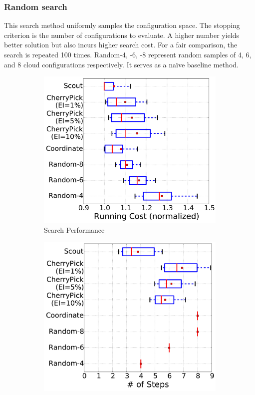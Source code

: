 \subsubsection*{Random search}
This search method
uniformly samples the configuration space.
The stopping criterion is the number of
configurations to evaluate.
A higher number yields better solution but also incurs higher search cost.
For a fair comparison, the search is repeated 100 times.  Random-4, -6, -8 represent random samples of 4, 6, and 8 cloud configurations respectively.
It serves as a na\"ive baseline method.


\begin{figure}[!htbp]
\centering
\begin{subfigure}[b]{0.4\textwidth}
    \includegraphics[width=\linewidth]{figures/single_cost_overall_performance.pdf}
    \caption{Search Performance}
    \label{fig:single_cost_overall_performance}
\end{subfigure}
\begin{subfigure}[b]{0.4\textwidth}
    \includegraphics[width=\linewidth]{figures/single_cost_overall_steps.pdf}

\end{subfigure}
\end{figure}
